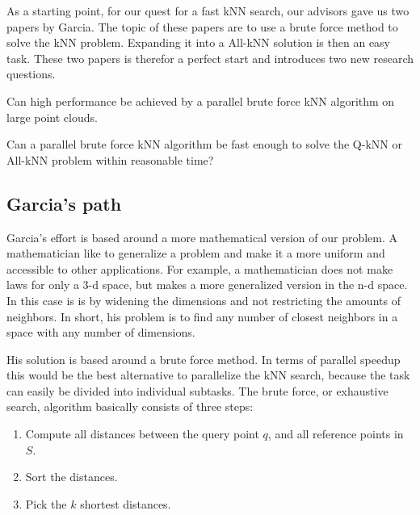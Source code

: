 
As a starting point, for our quest for a fast kNN search, our advisors gave us two papers by Garcia\citep{Garcia2008, Garcia2010}. The topic of these papers are to use a brute force method to solve the kNN problem. Expanding it into a All-kNN solution is then an easy task. These two papers is therefor a perfect start and introduces two new research questions.  

\begin{myrq}
Can high performance be achieved by a parallel brute force kNN algorithm on large point clouds.
\label{rq:brute_force_performance}
\end{myrq}

\begin{myrq}
Can a parallel brute force kNN algorithm be fast enough to solve the Q-kNN or All-kNN problem within reasonable time?
\label{rq:brute_force_Q-kNN}
\end{myrq}

\subsection{Garcia's path} %
\label{sub:garcia_s_effort}

Garcia's effort is based around a more mathematical version of our problem. A mathematician like to generalize a problem and make it a more uniform and accessible to other applications. For example, a mathematician does not make laws for only a 3-d space, but makes a more generalized version in the n-d space. In this case is is by widening the dimensions and not restricting the amounts of neighbors. In short, his problem is to find any number of closest neighbors in a space with any number of dimensions.  

His solution is based around a brute force method. In terms of parallel speedup this would be the best alternative to parallelize the kNN search, because the task can easily be divided into individual subtasks. The brute force, or exhaustive search, algorithm basically consists of three steps:

\begin{enumerate}
       \item Compute all distances between the query point $q$, and all reference points in $S$.
       \item Sort the distances.
       \item Pick the $k$ shortest distances.
\end{enumerate}

